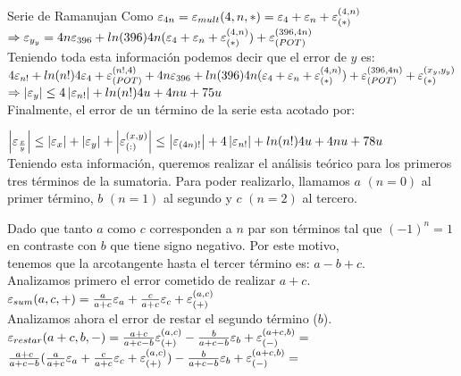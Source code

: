 \begin{subsection}{Serie de Ramanujan}
	Como $\varepsilon _{4n} = \varepsilon _{mult}({4,n,*}) = \varepsilon _{4} + \varepsilon _{n} + \varepsilon _{({*})}^{({4,n})}$\\
	
	$\Rightarrow \varepsilon _{y_y} = 4n\varepsilon _{396} + ln(396)4n(\varepsilon _{4} + \varepsilon _{n} + \varepsilon _{({*})}^{({4,n})}) + \varepsilon _{({POT})}^{({396,4n})}$\\
	
	Teniendo toda esta información podemos decir que el error de $y$ es:\\
	
	$4\varepsilon _{n!} + ln(n!) 4\varepsilon _{4} + \varepsilon _{({POT})}^{({n!,4})} + 4n\varepsilon _{396} + ln(396)4n(\varepsilon _{4} + \varepsilon _{n} + \varepsilon _{({*})}^{({4,n})}) + \varepsilon _{({POT})}^{({396,4n})} + \varepsilon _{({*})}^{({x_y,y_y})}$\\
	
	$\Rightarrow \left|\varepsilon _{y}\right| \leq 4\left|\varepsilon _{n!}\right| + ln(n!)4u + 4nu + 75u$\\
	
	Finalmente, el error de un término de la serie esta acotado por:
	
	\pa

	$\left|\varepsilon _{\frac{x}{y}}\right| \leq \left|\varepsilon _{x}\right| + \left|\varepsilon _{y}\right| + \left|\varepsilon _{({:})}^{({x,y})}\right| \leq \left|\varepsilon _{(4n)!}\right| + 4\left|\varepsilon _{n!}\right| + ln(n!)4u + 4nu + 78u$\\
	
	Teniendo esta información, queremos realizar el análisis teórico para los primeros tres términos de la sumatoria. Para poder realizarlo, llamamos $a$ $(n=0)$ al primer término,
	$b$ $(n=1)$ al segundo y $c$ $(n=2)$ al tercero.
	
	Dado que tanto $a$ como $c$ corresponden a $n$ par son términos tal que $(-1)^n = 1$ en contraste con $b$ que tiene signo negativo. Por este motivo,\\
	tenemos que la arcotangente hasta el tercer término es: $a - b + c$.\\
	
	Analizamos primero el error cometido de realizar $a+c$.\\
	
	$\varepsilon _{sum}({a,c,+}) = \frac{a}{a+c}\varepsilon _{a} + \frac{c}{a+c}\varepsilon _{c} + \varepsilon _{({+})}^{({a,c})}$\\
	
	Analizamos ahora el error de restar el segundo término ($b$).\\
		
	$\varepsilon _{restar}({a+c,b,-}) = \frac{a+c}{a+c-b}\varepsilon _{({+})}^{({a,c})} - \frac{b}{a+c-b}\varepsilon _{b} + \varepsilon _{({-})}^{({a+c,b})} =$\\
	
	$\frac{a+c}{a+c-b}(\frac{a}{a+c}\varepsilon _{a} + \frac{c}{a+c}\varepsilon _{c} + \varepsilon _{({+})}^{({a,c})}) - \frac{b}{a+c-b}\varepsilon _{b} + \varepsilon _{({-})}^{({a+c,b})} =$\\
	

\end{subsection}
